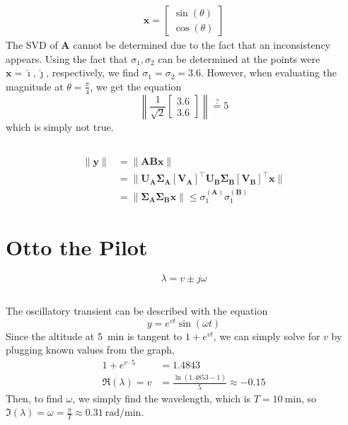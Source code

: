 \documentclass[]{article}
\newcommand{\unit}[1]{\bm{\hat{#1}}}
\newcommand{\tpose}[1]{\left[#1\right]^{\! \top} \!\!}
\begin{document}
\begin{align}
	\bm{x} =
	\begin{bmatrix}
	\sin(\theta) \\
	\cos(\theta)
	\end{bmatrix}
\end{align}
The SVD of \(\bm{A}\) cannot be determined due to the fact that an inconsistency appears.
Using the fact that \(\sigma_1, \sigma_2\) can be determined at the points were \(\bm{x} = \unit{\imath}, \unit{\jmath}\), respectively, we find \(\sigma_1 = \sigma_2 = 3.6\).
However, when evaluating the magnitude at \(\theta = \frac{\pi}{4}\), we get the equation
\begin{equation}
	\left\|\frac{1}{\sqrt{2}}\begin{bmatrix}
	3.6 \\
	3.6
	\end{bmatrix}\right\| \overset{?}{=} 5
\end{equation}
which is simply not true.

\subsection{}

\begin{align}
	\|\bm{y}\| &= \|\bm{ABx}\| \\
	&= \|\bm{U_A\Sigma_A}\tpose{\bm{V_A}}\bm{U_B\Sigma_B}\tpose{\bm{V_B}}\bm{x}\| \\
	&= \|\bm{\Sigma_A}\bm{\Sigma_B}\bm{x}\| \leqslant \sigma_1^{(\bm{A})} \sigma_1^{(\bm{B})}
\end{align}

\section{Otto the Pilot}

\begin{equation}
	\lambda = v \pm j\omega
\end{equation}

\subsection{}

The oscillatory transient can be described with the equation
\begin{equation}
	y = e^{vt} \sin(\omega t)
\end{equation}
Since the altitude at \SI{5}{\minute} is tangent to \(1 + e^{vt}\), we can simply solve for \(v\) by plugging known values from the graph,
\begin{align}
	1 + e^{v \cdot 5} &= 1.4843 \\
	\Re(\lambda) = v &= \frac{\ln(1.4853 - 1)}{5} \approx -0.15
\end{align}
Then, to find \(\omega\), we simply find the wavelength, which is \(T = \SI{10}{\minute}\), so \(\Im(\lambda) = \omega = \frac{\pi}{T} \approx \SI{0.31}{\radian\per\minute}\).
\end{document}
